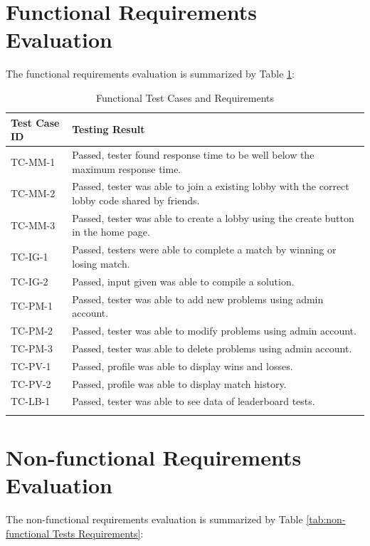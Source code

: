 \documentclass[12pt, titlepage]{article}
\begin{document}
\section{Functional Requirements Evaluation}
The functional requirements evaluation is summarized by Table \ref{tab:functional Tests Requirements}:

\begin{longtable}{| p{2.5cm} | p{11cm} |}
    \hline
    Test Case ID & Testing Result\\
    \hline
    TC-MM-1 & Passed, tester found response time to be well below the maximum response time.\\
    \hline
    TC-MM-2 & Passed, tester was able to join a existing lobby with the correct lobby code shared by friends. \\ 
     \hline
    TC-MM-3 & Passed, tester was able to create a lobby using the create button in the home page.\\
     \hline
    TC-IG-1 & Passed, testers were able to complete a match by winning or losing match.\\
     \hline
    TC-IG-2 & Passed, input given was able to compile a solution.\\
     \hline
    TC-PM-1 & Passed, tester was able to add new problems using admin account.\\
     \hline
    TC-PM-2 & Passed, tester was able to modify problems using admin account.\\
     \hline
    TC-PM-3 & Passed, tester was able to delete problems using admin account.\\
     \hline
    TC-PV-1 & Passed, profile was able to display wins and losses.\\
     \hline
    TC-PV-2 & Passed, profile was able to display match history.\\
     \hline
    TC-LB-1 & Passed, tester was able to see data of leaderboard tests.\\
     \hline
    \caption{Functional Test Cases and Requirements}
    \label{tab:functional Tests Requirements}
\end{longtable}


\section{Non-functional Requirements Evaluation}
The non-functional requirements evaluation is summarized by Table \ref{tab:non-functional Tests Requirements}:
\end{document}
